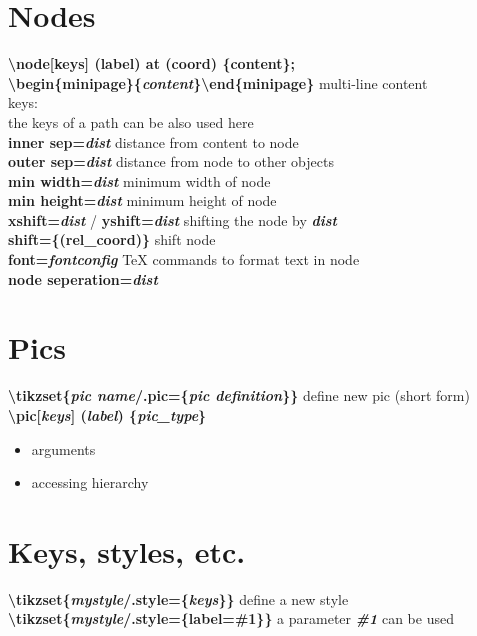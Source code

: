 \documentclass[10pt]{article}
\newcommand{\tikzcmd}[1]{\textbf{#1}}
\newcommand{\tikzparam}[1]{\textbf{\emph{#1}}}
\begin{document}
\begin{multicols}{2}
        \section{Nodes}
        \tikzcmd{\textbackslash node[keys] (label) at (coord) \{content\};}\\
        \tikzcmd{\textbackslash begin\{minipage\}\{\tikzparam{content}\}\textbackslash end\{minipage\} } multi-line content\\
        keys:\\
        the keys of a path can be also used here\\
        \tikzcmd{inner sep=\tikzparam{dist}} distance from content to node\\
        \tikzcmd{outer sep=\tikzparam{dist}} distance from node to other objects\\
        \tikzcmd{min width=\tikzparam{dist}} minimum width of node\\
        \tikzcmd{min height=\tikzparam{dist}} minimum height of node\\
        \tikzcmd{xshift=\tikzparam{dist}} / \tikzcmd{yshift=\tikzparam{dist}} shifting the node by \tikzparam{dist}\\
        \tikzcmd{shift=\{(rel\_coord)\}} shift node\\
        \tikzcmd{font=\tikzparam{fontconfig}} TeX commands to format text in node\\
        \tikzcmd{node seperation=\tikzparam{dist}}

        \section{Pics}
        \tikzcmd{\textbackslash tikzset\{\tikzparam{pic name}/.pic=\{\tikzparam{pic definition}\}\}} define new pic (short form)\\
        \tikzcmd{\textbackslash pic[\tikzparam{keys}] (\tikzparam{label}) \{\tikzparam{pic\_type}\} }
        \begin{itemize}

            \item arguments
            \item accessing hierarchy
        \end{itemize}

        \section{Keys, styles, etc.}
        \tikzcmd{\textbackslash tikzset\{\tikzparam{mystyle}/.style=\{\tikzparam{keys}\}\}} define a new style\\
        \tikzcmd{\textbackslash tikzset\{\tikzparam{mystyle}/.style=\{label=\#1\}\}} a parameter \tikzparam{\#1} can be used\\


\end{multicols}
\end{document}
